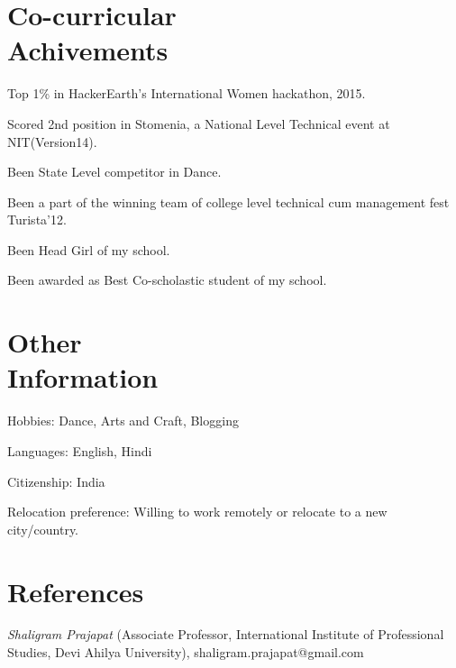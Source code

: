 \documentclass[margin,line]{resume}
\begin{document}
\begin{resume}
    \section{\mysidestyle Co-curricular \\ Achivements}
    \begin{list2}
    \item Top 1\% in HackerEarth’s International Women hackathon, 2015.
    \item Scored 2nd position in Stomenia, a National Level Technical event at NIT(Version14).
    \item Been State Level competitor in Dance.
    \item Been a part of the winning team of college level technical cum management fest Turista'12.
    \item Been Head Girl of my school.
    \item Been awarded as Best Co-scholastic student of my school.
    \end{list2}
    
    \section{\mysidestyle Other \\ Information}
    \begin{list2}
    \item Hobbies: Dance, Arts and Craft, Blogging
    \item Languages: English, Hindi
    \item Citizenship: India
    \item Relocation preference: Willing to work remotely or relocate to a new city/country.   
    \end{list2}
    \section{\mysidestyle References} 

    \begin{list2}
    \item {\sl Shaligram Prajapat} (Associate Professor, International Institute of Professional Studies, Devi Ahilya University), shaligram.prajapat@gmail.com
    \end{list2}

\end{resume}
\end{document}
